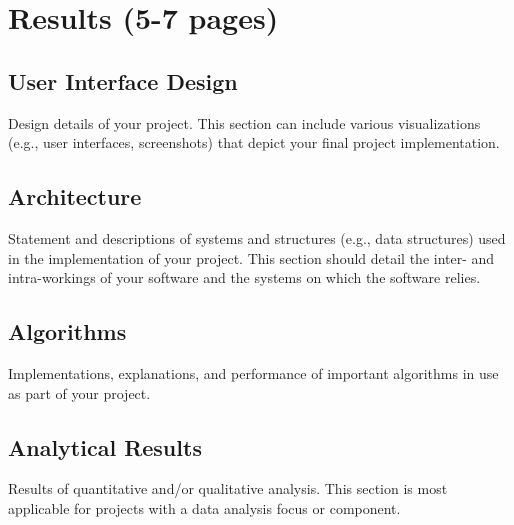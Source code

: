 \chapter{Results (5-7 pages)}



\section{User Interface Design}

Design details of your project. This section can include various visualizations (e.g., user interfaces, screenshots) that depict your final project implementation.




\section{Architecture}

Statement and descriptions of systems and structures (e.g., data structures) used in the implementation of your project. This section should detail the inter- and intra-workings of your software and the systems on which the software relies.




\section{Algorithms}

Implementations, explanations, and performance of important algorithms in use as part of your project.




\section{Analytical Results}

Results of quantitative and/or qualitative analysis. This section is most applicable for projects with a data analysis focus or component.




